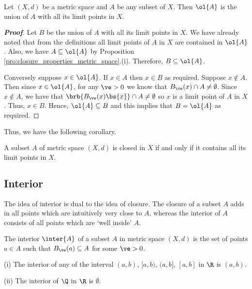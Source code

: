 \begin{theorem}
Let $(X,d)$ be a metric space and $A$ be any subset of $X$. Then $\ol{A}$ is the union of $A$ with all its limit points in $X$.
\end{theorem}

\begin{proof}[\bf Proof]
Let $B$ be the union of $A$ with all its limit points in $X$. We have already noted that from the definitions all limit points of $A$ in $X$ are contained in $\ol{A}$. Also, we have $A\subseteq \ol{A}$ by Proposition \ref{pro:closure_properties_metric_space}.(i). Therefore, $B\subseteq \ol{A}$.

Conversely suppose $x\in \ol{A}$. If $x\in A$ then $x\in B$ as required. Suppose $x\notin A$. Then since $x\in \ol{A}$, for any $\ve>0$ we know that $B_\ve(x)\cap A \neq \emptyset$. Since $x\notin A$, we have that $\brb{B_\ve(x)\bs{x}}\cap A \neq \emptyset$ so $x$ is a limit point of $A$ in $X$. Thus, $x\in B$. Hence, $\ol{A}\subseteq B$ and this implies that $B = \ol{A}$ as required.
\end{proof}

Thus, we have the following corollary.

\begin{corollary}\label{cor:closed_set_iff_contains_all_limit_points_metric}
A subset $A$ of metric space $(X,d)$ is closed in $X$ if and only if it contains all its limit points in $X$.
\end{corollary}


\subsection{Interior}

The idea of interior is dual to the idea of closure. The closure of a subset $A$ adds in all points which are intuitively very close to $A$, whereas the interior of $A$ consists of all points which
are `well inside' $A$.

\begin{definition}\label{def:interior}
The interior $\inter{A}$ of a subset $A$ in metric space $(X,d)$ is the set of points $a\in A$ such that $B_\ve(a)\subseteq A$ for some $\ve >0$.
\end{definition}

\begin{example}
\ben
\item [(i)] The interior of any of the interval $(a,b)$, $[a,b)$, $(a,b]$, $[a,b]$ in $\R$ is $(a,b)$.
\item [(ii)] The interior of $\Q$ in $\R$ is $\emptyset$.
\een
\end{example}




